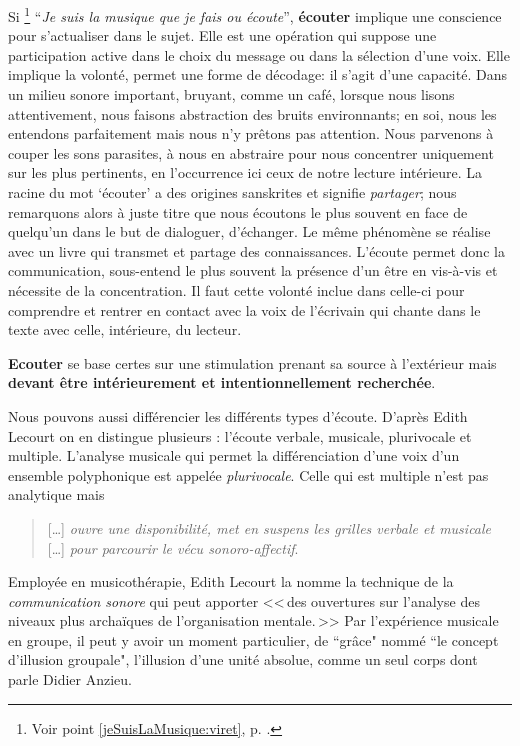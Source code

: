 Si %
\footnote{Voir point \ref{jeSuisLaMusique:viret}, p. \pageref{jeSuisLaMusique:viret}.}
\enquote{\emph{Je suis la musique que je fais ou écoute}}\autocite{viret:b}, \textbf{écouter} implique 
une conscience pour s'actualiser dans le sujet. Elle est une opération 
qui suppose une participation active dans le choix du message
ou dans la sélection d'une voix. Elle  implique la volonté,
permet une forme de décodage: il s'agit d'une capacité.
Dans un milieu sonore important,
 bruyant, comme un café, lorsque nous lisons attentivement, nous faisons abstraction
des bruits environnants; en soi, nous les entendons parfaitement mais nous n'y
prêtons pas attention. Nous parvenons à couper les sons parasites, à nous en abstraire pour
nous concentrer uniquement sur les plus  pertinents, en l'occurrence ici ceux de notre lecture intérieure.
 La racine du mot `écouter' a des origines sanskrites et signifie \emph{partager}; nous remarquons alors à juste titre que nous écoutons le plus souvent en face de quelqu'un dans le but de dialoguer, d'échanger. Le même phénomène se réalise avec un livre qui transmet et partage des connaissances. L'écoute permet donc la communication, sous-entend le plus souvent la présence d'un être en vis-à-vis et nécessite de la  concentration. Il faut cette volonté inclue dans celle-ci  pour comprendre et rentrer en contact avec la voix de  l'écrivain qui chante dans le texte avec celle, intérieure, du lecteur.
 
 
 \textbf{Ecouter} se base certes sur une stimulation prenant sa source à 
l'extérieur mais \textbf{devant être intérieurement et  intentionnellement
	recherchée}.




Nous pouvons aussi différencier les différents types d'écoute. D'après Edith Lecourt \autocite[ch. 10 <<\,De l'écoute verbale à l'écoute musicale\,>>, p. 182.]{lecourt:decouvrir}
 on en distingue plusieurs : l'écoute verbale, musicale, plurivocale et multiple.
 L'analyse musicale qui permet la différenciation d'une voix d'un ensemble polyphonique est appelée \emph{plurivocale}. Celle qui est multiple n'est pas analytique  mais 
 \begin{quote}
 	 [\ldots] \textit{ouvre une disponibilité, met en suspens les grilles verbale et musicale} [\ldots] \emph{pour parcourir le vécu sonoro-affectif}\autocite[p. 183]{lecourt:decouvrir}.
 \end{quote}
 Employée en musicothérapie, Edith Lecourt la nomme la technique de la  \emph{communication sonore} qui peut apporter 
 <<\,des ouvertures sur l'analyse des niveaux plus archaïques de l'organisation mentale.\,>>\autocite[p. 154]{lecourt:decouvrir}	
 Par l'expérience musicale en groupe, il peut y avoir un moment particulier, de ``grâce"  nommé ``le concept d'illusion groupale", l'illusion d'une unité absolue, comme un seul corps\autocite{anzieu:groupal} dont parle Didier Anzieu.


